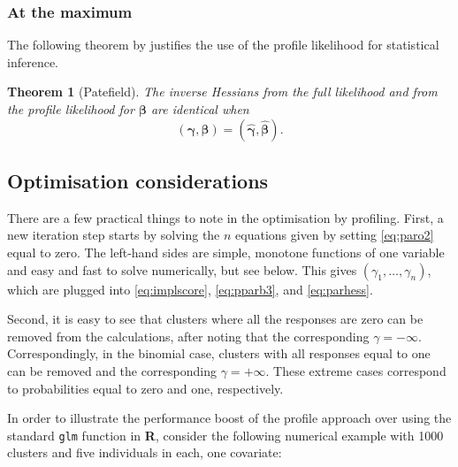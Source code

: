 \documentclass[a4paper,11pt]{article}
\newtheorem{theorem}{Theorem}
\newcommand{\bb}{\ensuremath{\boldsymbol{\beta}}}
\newcommand{\bg}{\ensuremath{\boldsymbol{\gamma}}}
\begin{document}
\subsubsection{At the maximum}
The following theorem by \citet{patefield} justifies the use of the
profile likelihood for statistical inference.

\begin{theorem}[Patefield] The inverse Hessians from the full likelihood 
and from the profile likelihood for $\bb$ are identical when 
\begin{equation*}
(\bg, \bb) = (\hat{\bg}, \hat{\bb}).
\end{equation*}

\end{theorem}

\subsection{Optimisation considerations}

There are a few practical things to note in the optimisation by
profiling. First, a new iteration step starts by solving the $n$ equations
given by setting \eqref{eq:paro2} equal to zero. The left-hand sides are
simple, monotone functions of one 
variable and easy and fast to solve numerically, but see below. This gives
$(\gamma_1, \ldots, \gamma_n)$, which 
are plugged into \eqref{eq:implscore}, \eqref{eq:pparb3}, and \eqref{eq:parhess}. 

Second, it is easy to see that clusters where all the responses are zero
can be removed from the calculations, after noting that the corresponding
$\gamma = -\infty$. Correspondingly, in the binomial case, clusters with
all responses equal to one can be removed and the corresponding $\gamma =
+\infty$. These extreme cases correspond to probabilities equal to zero and
one, respectively. 

In order to illustrate the performance boost of the profile approach over
using the standard {\tt glm} function in {\bf R}, consider the following
numerical example with 1000 clusters and five individuals in each, one
covariate:
\end{document}
